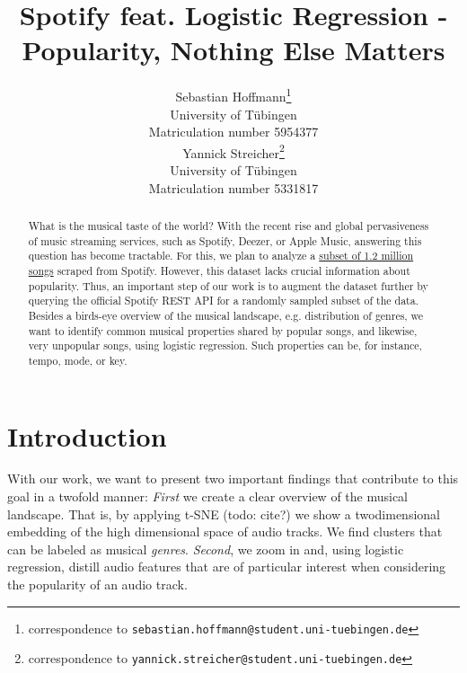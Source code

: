 \documentclass{article}
\title{Spotify feat. Logistic Regression - \\ Popularity, Nothing Else Matters}
\author{%
  Sebastian Hoffmann\thanks{correspondence to \texttt{sebastian.hoffmann@student.uni-tuebingen.de}}\\
  University of Tübingen\\
  Matriculation number 5954377\\
  \And
  Yannick Streicher\thanks{correspondence to \texttt{yannick.streicher@student.uni-tuebingen.de}}\\
  University of Tübingen\\
  Matriculation number 5331817\\
}
\newcommand{\todo}[1]{{\color{red}todo: #1}}
\begin{document}
\maketitle

\begin{abstract}
  What is the musical taste of the world? With the recent rise and global pervasiveness of music streaming services, such as Spotify, Deezer, or Apple Music, answering this question has become tractable. For this, we plan to analyze a \href{https://www.kaggle.com/rodolfofigueroa/spotify-12m-songs}{subset of 1.2 million songs} scraped from Spotify. However, this dataset lacks crucial information about popularity. Thus, an important step of our work is to augment the dataset further by querying the official Spotify REST API for a randomly sampled subset of the data. Besides a birds-eye overview of the musical landscape, e.g. distribution of genres, we want to identify common musical properties shared by popular songs, and likewise, very unpopular songs, using logistic regression. Such properties can be, for instance, tempo, mode, or key.
\end{abstract}

\section{Introduction}




With our work, we want to present two important findings that contribute to this goal in a twofold manner: \textit{First} we create a clear overview of the musical landscape. That is, by applying t-SNE (\todo{cite?}) we show a twodimensional embedding of the high dimensional space of audio tracks. We find clusters that can be labeled as musical \textit{genres}. \textit{Second}, we zoom in and, using logistic regression, distill audio features that are of particular interest when considering the popularity of an audio track.
\end{document}
